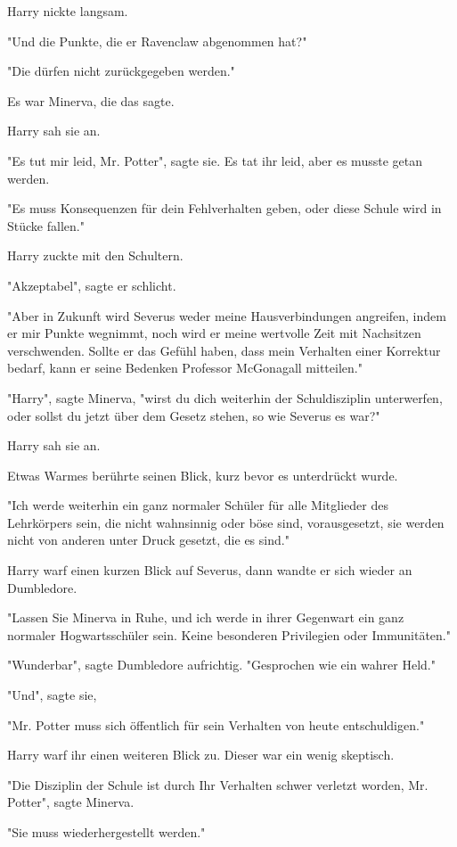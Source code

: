 {Harry nickte langsam.

"Und die Punkte, die er Ravenclaw abgenommen hat?"

"Die dürfen nicht zurückgegeben werden."

Es war Minerva, die das sagte.

Harry sah sie an.

"Es tut mir leid, Mr. Potter", sagte sie. Es tat ihr leid, aber es musste getan werden.

"Es muss Konsequenzen für dein Fehlverhalten geben, oder diese Schule wird in Stücke fallen."

Harry zuckte mit den Schultern.

"Akzeptabel", sagte er schlicht.

"Aber in Zukunft wird Severus weder meine Hausverbindungen angreifen, indem er mir Punkte wegnimmt, noch wird er meine wertvolle Zeit mit Nachsitzen verschwenden. Sollte er das Gefühl haben, dass mein Verhalten einer Korrektur bedarf, kann er seine Bedenken Professor McGonagall mitteilen."

"Harry", sagte Minerva, "wirst du dich weiterhin der Schuldisziplin unterwerfen, oder sollst du jetzt über dem Gesetz stehen, so wie Severus es war?"

Harry sah sie an.

Etwas Warmes berührte seinen Blick, kurz bevor es unterdrückt wurde.

"Ich werde weiterhin ein ganz normaler Schüler für alle Mitglieder des Lehrkörpers sein, die nicht wahnsinnig oder böse sind, vorausgesetzt, sie werden nicht von anderen unter Druck gesetzt, die es sind."

Harry warf einen kurzen Blick auf Severus, dann wandte er sich wieder an Dumbledore.

"Lassen Sie Minerva in Ruhe, und ich werde in ihrer Gegenwart ein ganz normaler Hogwartsschüler sein. Keine besonderen Privilegien oder Immunitäten."

"Wunderbar", sagte Dumbledore aufrichtig. "Gesprochen wie ein wahrer Held."

"Und", sagte sie,

"Mr. Potter muss sich öffentlich für sein Verhalten von heute entschuldigen."

Harry warf ihr einen weiteren Blick zu. Dieser war ein wenig skeptisch.

"Die Disziplin der Schule ist durch Ihr Verhalten schwer verletzt worden, Mr. Potter", sagte Minerva.

"Sie muss wiederhergestellt werden."

}

